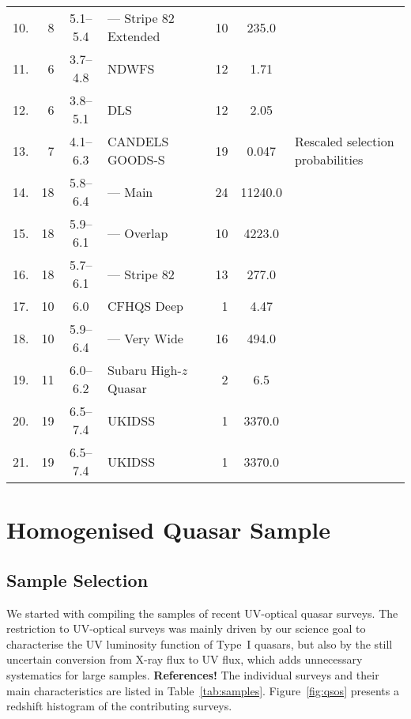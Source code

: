 \documentclass[a4paper,fleqn,usenatbib]{mnras}
\begin{document}
\begin{table*}
\begin{tabular}{crcllrSl}
    10. & 8 & 5.1--5.4 & ---  Stripe 82 Extended & \citet{2013ApJ...768..105M} & 10 & 235.0 & \\
    11. & 6 & 3.7--4.8 & NDWFS & \citet{2011ApJ...728L..26G} & 12 & 1.71 & \\
    12. & 6 & 3.8--5.1 & DLS & \citet{2011ApJ...728L..26G} & 12 & 2.05 & \\
    13. & 7 & 4.1--6.3 & CANDELS GOODS-S & \citet{2015AA...578A..83G} & 19 & 0.047 & Rescaled selection probabilities \\
    14. & 18 & 5.8--6.4 & --- Main & \citet{2016ApJ...833..222J} & 24 & 11240.0 & \\
    15. & 18 & 5.9--6.1 & --- Overlap & \citet{2016ApJ...833..222J} & 10 & 4223.0 & \\
    16. & 18 & 5.7--6.1 & --- Stripe 82 & \citet{2016ApJ...833..222J} & 13 & 277.0 & \\
    17. & 10 & 6.0 & CFHQS Deep & \citet{2010AJ....139..906W} & 1 & 4.47 & \\
    18. & 10 & 5.9--6.4 & --- Very Wide & \citet{2010AJ....139..906W} & 16 & 494.0 & \\
    19. & 11 & 6.0--6.2 & Subaru High-$z$ Quasar & \citet{2015ApJ...798...28K} & 2 & 6.5 & \\
    20. & 19 & 6.5--7.4 & UKIDSS & \citet{2011Natur.474..616M} & 1 & 3370.0 & \\
    21. & 19 & 6.5--7.4 & UKIDSS & \citet{2007MNRAS.376L..76V} & 1 & 3370.0 & \\
  \end{tabular}
\end{table*}

\section{Homogenised Quasar Sample}

\subsection{Sample Selection}

We started with compiling the samples of recent UV-optical quasar
surveys. The restriction to UV-optical surveys was mainly driven by
our science goal to characterise the UV luminosity function of Type~I
quasars, but also by the still uncertain conversion from X-ray flux to
UV flux, which adds unnecessary systematics for large
samples. \textbf{References!} The individual surveys and their main
characteristics are listed in
Table~\ref{tab:samples}. Figure~\ref{fig:qsos} presents a redshift
histogram of the contributing surveys.
\end{document}
